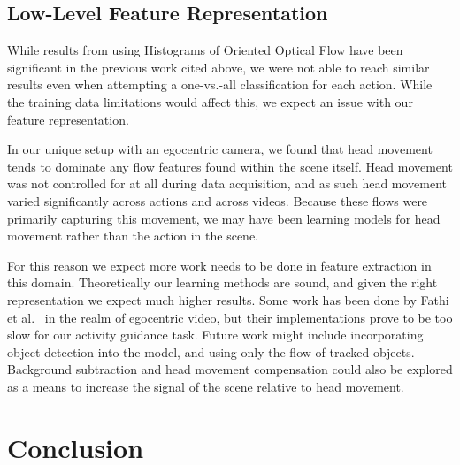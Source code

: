 \documentclass[10pt,twocolumn,letterpaper]{article}
\begin{document}
\subsection{Low-Level Feature Representation}

While results from using Histograms of Oriented Optical Flow have been significant in the previous work cited above, we were not able to reach similar results even when attempting a one-vs.-all classification for each action. While the training data limitations would affect this, we expect an issue with our feature representation.

In our unique setup with an egocentric camera, we found that head movement tends to dominate any flow features found within the scene itself. Head movement was not controlled for at all during data acquisition, and as such head movement varied significantly across actions and across videos. Because these flows were primarily capturing this movement, we may have been learning models for head movement rather than the action in the scene.

For this reason we expect more work needs to be done in feature extraction in this domain. Theoretically our learning methods are sound, and given the right representation we expect much higher results. Some work has been done by Fathi et al.~\cite{fathi2011understanding} in the realm of egocentric video, but their implementations prove to be too slow for our activity guidance task. Future work might include incorporating object detection into the model, and using only the flow of tracked objects. Background subtraction and head movement compensation could also be explored as a means to increase the signal of the scene relative to head movement.
 
\section{Conclusion}



{\small


}
\end{document}
